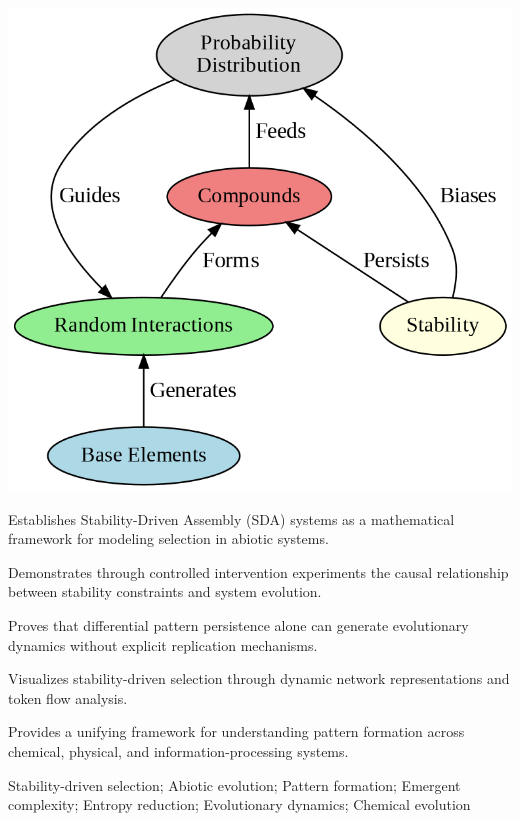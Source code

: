 \documentclass[preprint,12pt]{elsarticle}
\begin{document}
\begin{frontmatter}
\begin{graphicalabstract}
\includegraphics[width=1\textwidth]{figure_10}
\end{graphicalabstract}

\begin{highlights}
\item Establishes Stability-Driven Assembly (SDA) systems as a mathematical framework for modeling selection in abiotic systems.
\item Demonstrates through controlled intervention experiments the causal relationship between stability constraints and system evolution.
\item Proves that differential pattern persistence alone can generate evolutionary dynamics without explicit replication mechanisms.
\item Visualizes stability-driven selection through dynamic network representations and token flow analysis.
\item Provides a unifying framework for understanding pattern formation across chemical, physical, and information-processing systems.
\end{highlights}

\begin{keyword}
Stability-driven selection; Abiotic evolution; Pattern formation; Emergent complexity; Entropy reduction; Evolutionary dynamics; Chemical evolution
\end{keyword}




\end{frontmatter}
\end{document}
